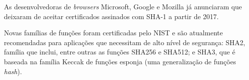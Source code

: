 As desenvolvedoras de \emph{browsers} Microsoft, Google e Mozilla já anunciaram que deixaram de aceitar certificados assinados com SHA-1 a partir de 2017.

Novas famílias de funções foram certificadas pelo NIST e são atualmente recomendadas para aplicações que necessitam de alto nível de segurança: SHA2, família que inclui, entre outras as funções SHA256 e SHA512; e SHA3, que é baseada na família Keccak de funções esponja (uma generalização de funções \emph{hash}).